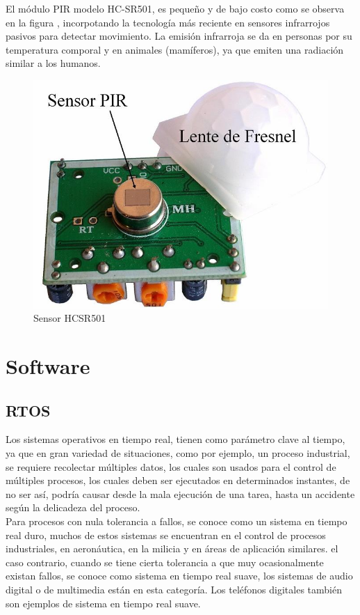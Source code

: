 El módulo PIR modelo HC-SR501, es pequeño y de bajo costo como se observa en la figura , incorpotando la tecnología más reciente en sensores infrarrojos pasivos para detectar movimiento. La emisión infrarroja se da en personas por su temperatura comporal y en animales (mamíferos), ya que emiten una radiación similar a los humanos. \cite{PIR2}

\begin{figure}[H]
	\centering
	\caption{Sensor HCSR501 \cite{PIR2}}
	\label{fig:sensor-hc-sr501-1000-m}
	\includegraphics[width=0.5\linewidth]{Imagenes/SENSOR-HC-SR501-1000-M}
\end{figure}

\section{Software}

\subsection{RTOS}

Los sistemas operativos en tiempo real, tienen como parámetro clave al tiempo, ya que en gran variedad de situaciones, como por ejemplo, un proceso industrial, se requiere recolectar múltiples datos, los cuales son usados para el control de múltiples procesos, los cuales deben ser ejecutados en determinados instantes, de no ser así, podría causar desde la mala ejecución de una tarea, hasta un accidente según la delicadeza del proceso.\\ 

Para procesos con nula tolerancia a fallos, se conoce como un sistema en tiempo real duro, muchos de estos sistemas se encuentran en el control de procesos industriales, en aeronáutica, en la milicia y en áreas de aplicación similares. el caso contrario, cuando se tiene cierta tolerancia a que muy ocasionalmente existan fallos, se conoce como sistema en tiempo real suave, los sistemas de audio digital o de multimedia están en esta categoría. Los teléfonos digitales también son ejemplos de sistema en tiempo real suave. \cite{SO} \\

